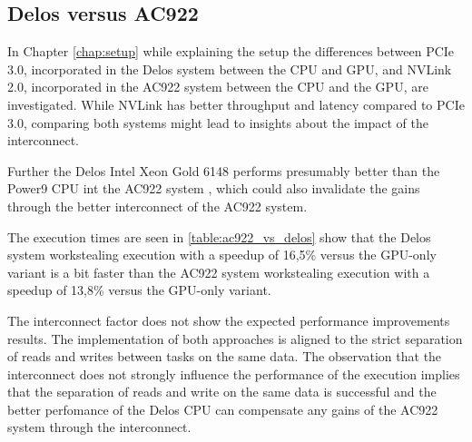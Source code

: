 \subsection{Delos versus AC922}
In Chapter \ref{chap:setup} while explaining the setup the differences between PCIe 3.0, incorporated in the Delos system between the CPU and GPU, and NVLink 2.0, incorporated in the AC922 system between the CPU and the GPU, are investigated. While NVLink has better throughput and latency compared to PCIe 3.0, comparing both systems might lead to insights about the impact of the interconnect.

Further the Delos Intel Xeon Gold 6148 performs presumably better than the Power9 CPU int the AC922 system \cite{POWER9BenchmarksVs}, which could also invalidate the gains through the better interconnect of the AC922 system.



The execution times are seen in \ref{table:ac922_vs_delos} show that the Delos system workstealing execution with a speedup of 16,5\% versus the GPU-only variant is a bit faster than the AC922 system workstealing execution with a speedup of 13,8\% versus the GPU-only variant.

The interconnect factor does not show the expected performance improvements results. The implementation of both approaches is aligned to the strict separation of reads and writes between tasks on the same data. The observation that the interconnect does not strongly influence the performance of the execution implies that the separation of reads and write on the same data is successful and the better perfomance of the Delos CPU can compensate any gains of the AC922 system through the interconnect.




